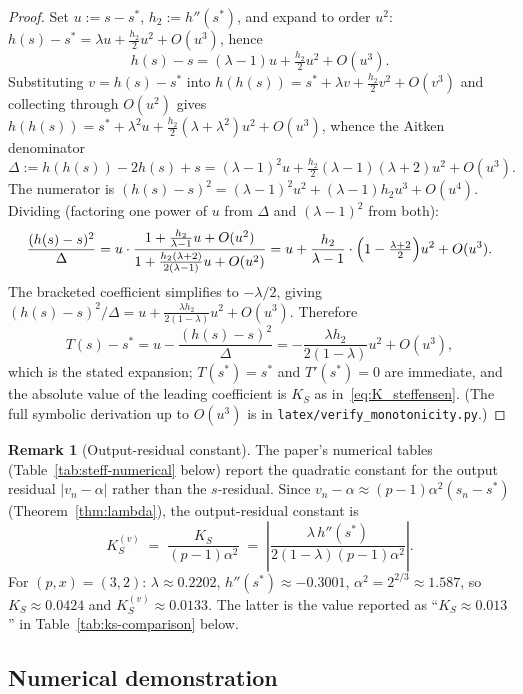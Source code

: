 \documentclass[11pt,a4paper]{article}
\theoremstyle{definition}
\newtheorem{remark}{Remark}[section]
\begin{document}
\begin{proof}
Set $u := s - s^*$, $h_2 := h''(s^*)$, and expand to order $u^2$:
$h(s) - s^* = \lambda u + \tfrac{h_2}{2}u^2 + O(u^3)$, hence
\[
  h(s) - s = (\lambda - 1)u + \tfrac{h_2}{2}u^2 + O(u^3).
\]
Substituting $v = h(s) - s^*$ into $h(h(s)) = s^* + \lambda v + \tfrac{h_2}{2}v^2 + O(v^3)$ and collecting through $O(u^2)$ gives $h(h(s)) = s^* + \lambda^2 u + \tfrac{h_2}{2}(\lambda + \lambda^2)u^2 + O(u^3)$, whence the Aitken denominator
\[
  \Delta := h(h(s)) - 2h(s) + s = (\lambda - 1)^2 u + \tfrac{h_2}{2}(\lambda - 1)(\lambda + 2)u^2 + O(u^3).
\]
The numerator is $(h(s) - s)^2 = (\lambda - 1)^2 u^2 + (\lambda - 1)h_2 u^3 + O(u^4)$. Dividing (factoring one power of $u$ from $\Delta$ and $(\lambda-1)^2$ from both):
\[
  \frac{(h(s) - s)^2}{\Delta}
   = u \cdot \frac{1 + \tfrac{h_2}{\lambda-1}u + O(u^2)}{1 + \tfrac{h_2(\lambda+2)}{2(\lambda-1)}u + O(u^2)}
   = u + \frac{h_2}{\lambda - 1}\cdot\Bigl(1 - \tfrac{\lambda+2}{2}\Bigr)u^2 + O(u^3).
\]
The bracketed coefficient simplifies to $-\lambda/2$, giving $(h(s)-s)^2/\Delta = u + \tfrac{\lambda h_2}{2(1-\lambda)}u^2 + O(u^3)$. Therefore
\[
  T(s) - s^* = u - \frac{(h(s)-s)^2}{\Delta} = -\frac{\lambda h_2}{2(1-\lambda)}u^2 + O(u^3),
\]
which is the stated expansion; $T(s^*) = s^*$ and $T'(s^*) = 0$ are immediate, and the absolute value of the leading coefficient is $K_S$ as in~\eqref{eq:K_steffensen}. (The full symbolic derivation up to $O(u^3)$ is in \texttt{latex/verify\_monotonicity.py}.)
\end{proof}

\begin{remark}[Output-residual constant]\label{rem:K-output}
The paper's numerical tables (Table~\ref{tab:steff-numerical} below) report the quadratic constant for the output residual $|v_n - \alpha|$ rather than the $s$-residual. Since $v_n - \alpha \approx (p-1)\alpha^2(s_n - s^*)$ (Theorem~\ref{thm:lambda}), the output-residual constant is
\[
  K_S^{(v)} \;=\; \frac{K_S}{(p-1)\alpha^2}
          \;=\; \left|\frac{\lambda\, h''(s^*)}{2(1 - \lambda)(p-1)\alpha^2}\right|.
\]
For $(p, x) = (3, 2)$: $\lambda \approx 0.2202$, $h''(s^*) \approx -0.3001$, $\alpha^2 = 2^{2/3} \approx 1.587$, so $K_S \approx 0.0424$ and $K_S^{(v)} \approx 0.0133$. The latter is the value reported as ``$K_S \approx 0.013$'' in Table~\ref{tab:ks-comparison} below.
\end{remark}

\subsection{Numerical demonstration}
\end{document}
